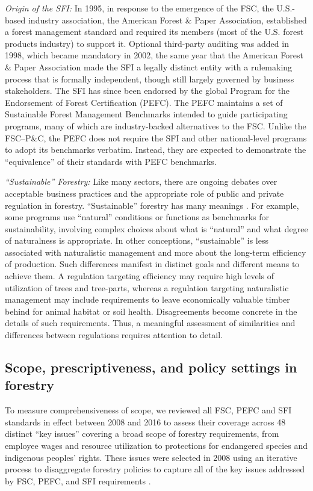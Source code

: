 \documentclass[
      12pt,
            Review ]{article}
\begin{document}
\emph{Origin of the SFI:} In 1995, in response to the emergence of the
FSC, the U.S.-based industry association, the American Forest \& Paper
Association, established a forest management standard and required its
members (most of the U.S. forest products industry) to support it.
Optional third-party auditing was added in 1998, which became mandatory
in 2002, the same year that the American Forest \& Paper Association
made the SFI a legally distinct entity with a rulemaking process that is
formally independent, though still largely governed by business
stakeholders. The SFI has since been endorsed by the global Program for
the Endorsement of Forest Certification (PEFC). The PEFC maintains a set
of Sustainable Forest Management Benchmarks intended to guide
participating programs, many of which are industry-backed alternatives
to the FSC. Unlike the FSC--P\&C, the PEFC does not require the SFI and
other national-level programs to adopt its benchmarks verbatim. Instead,
they are expected to demonstrate the ``equivalence'' of their standards
with PEFC benchmarks.

\emph{``Sustainable'' Forestry:} Like many sectors, there are ongoing
debates over acceptable business practices and the appropriate role of
public and private regulation in forestry. ``Sustainable'' forestry has
many meanings \citep{McDermott2012}. For example, some programs use
``natural'' conditions or functions as benchmarks for sustainability,
involving complex choices about what is ``natural'' and what degree of
naturalness is appropriate. In other conceptions, ``sustainable'' is
less associated with naturalistic management and more about the
long-term efficiency of production. Such differences manifest in
distinct goals and different means to achieve them. A regulation
targeting efficiency may require high levels of utilization of trees and
tree-parts, whereas a regulation targeting naturalistic management may
include requirements to leave economically valuable timber behind for
animal habitat or soil health. Disagreements become concrete in the
details of such requirements. Thus, a meaningful assessment of
similarities and differences between regulations requires attention to
detail.

\subsection{Scope, prescriptiveness, and policy settings in
forestry}\label{scope-prescriptiveness-and-policy-settings-in-forestry}

To measure comprehensiveness of scope, we reviewed all FSC, PEFC and SFI
standards in effect between 2008 and 2016 to assess their coverage
across 48 distinct ``key issues'' covering a broad scope of forestry
requirements, from employee wages and resource utilization to
protections for endangered species and indigenous peoples' rights. These
issues were selected in 2008 using an iterative process to disaggregate
forestry policies to capture all of the key issues addressed by FSC,
PEFC, and SFI requirements \citep{McDermott2010}.
\end{document}
